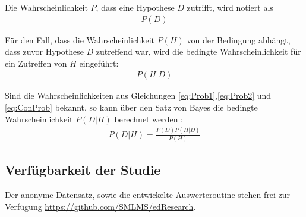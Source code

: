 \noindent
Die Wahrscheinlichkeit $P$, dass eine Hypothese $D$ zutrifft, wird notiert als
\begin{align}
\label{eq:Prob2}
	P(D)
\end{align}

\noindent
Für den Fall, dass die Wahrscheinlichkeit $P(H)$ von der Bedingung abhängt, dass zuvor Hypothese $D$ zutreffend war, wird die bedingte Wahrscheinlichkeit für ein Zutreffen von $H$ eingeführt:
\begin{align}
\label{eq:ConProb}
	P(H|D)
\end{align}

\noindent
Sind die Wahrscheinlichkeiten aus Gleichungen \eqref{eq:Prob1},\eqref{eq:Prob2} und \eqref{eq:ConProb} bekannt, so kann über den Satz von Bayes die bedingte Wahrscheinlichkeit $P(D|H)$ berechnet werden \cite{Eddy.2004}:
\begin{align}
\label{eq:Bayes}
	P(D|H) = \frac{P(D)P(H|D)}{P(H)}
\end{align}

\subsection{Verfügbarkeit der Studie}
Der anonyme Datensatz, sowie die entwickelte Auswerteroutine stehen frei zur Verfügung \url{https://github.com/SMLMS/edResearch}.